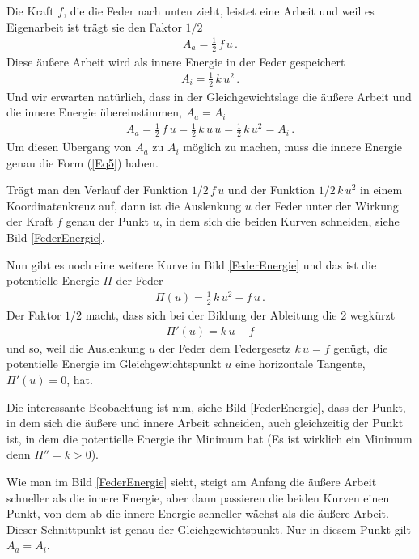 Die Kraft $ f $, die die Feder nach unten zieht, leistet eine Arbeit und weil es Eigenarbeit ist tr\"{a}gt sie den Faktor $1/2$
\begin{align}
A_a = \frac{1}{2}\,f\,u\,.
\end{align}
Diese \"{a}u{\ss}ere Arbeit wird als innere Energie in der Feder gespeichert
\begin{align}\label{Eq5}
A_i = \frac{1}{2}\, k\,u^2\,.
\end{align}
Und wir erwarten nat\"{u}rlich, dass in der Gleichgewichtslage die \"{a}u{\ss}ere Arbeit und die innere Energie \"{u}bereinstimmen, $A_a = A_i$
\begin{align}
A_a = \frac{1}{2}\, f\,u = \frac{1}{2}\, k\,u\,u = \frac{1}{2}\, k\,u^2 = A_i\,.
\end{align}
Um diesen \"{U}bergang von $A_a$ zu $A_i$ m\"{o}glich zu machen, muss die innere Energie genau die Form (\ref{Eq5}) haben.

Tr\"{a}gt man den Verlauf der Funktion $1/2\,f\,u $ und der Funktion $1/2\,k\,u^2 $ in einem Koordinatenkreuz auf,
dann ist die Auslenkung $ u$ der Feder  unter der Wirkung der Kraft $ f $ genau der Punkt $u$, in dem sich die beiden Kurven schneiden, siehe Bild \ref{FederEnergie}.

Nun gibt es noch eine weitere Kurve in Bild \ref{FederEnergie} und das ist die potentielle Energie $\Pi$ der Feder
\begin{align}
\Pi(u) = \frac{1}{2}\, k\,u^2 - f\,u\,.
\end{align}
Der Faktor $1/2$ macht, dass sich bei der Bildung der Ableitung die 2 wegk\"{u}rzt
\begin{align}
\Pi'(u) = k\,u - f
\end{align}
und so, weil die Auslenkung $ u $ der Feder dem Federgesetz $k\,u = f $ gen\"{u}gt, die potentielle Energie im Gleichgewichtspunkt $u$ eine horizontale Tangente, $\Pi'(u) = 0$, hat.

Die interessante Beobachtung ist nun, siehe Bild \ref{FederEnergie}, dass der Punkt, in dem sich die \"{a}u{\ss}ere und innere Arbeit schneiden,  auch gleichzeitig der Punkt ist, in dem die potentielle Energie ihr Minimum hat (Es ist wirklich ein Minimum denn $\Pi'' = k > 0$).

Wie man im Bild \ref{FederEnergie} sieht, steigt am Anfang die \"{a}u{\ss}ere Arbeit schneller als die innere Energie, aber dann passieren die beiden Kurven einen Punkt, von dem ab die innere Energie schneller w\"{a}chst als die \"{a}u{\ss}ere Arbeit. Dieser Schnittpunkt ist genau der Gleichgewichtspunkt. Nur in diesem Punkt gilt $A_a = A_i$.

